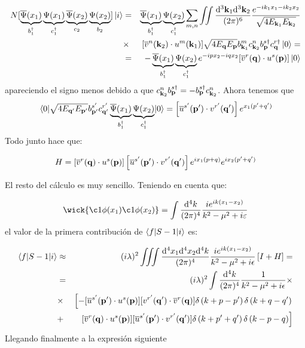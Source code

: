 \begin{solucion}
\begin{itemize}
		\begin{eqnarray*}			
			N[\underbrace{ \overline{\Psi} (x_1)}_{b^\dagger_1}\underbrace{ \Psi (x_1)}_{c^\dagger_1}  \underbrace{ \overline{\Psi} 	(x_2)}_{c_2} \underbrace{ \Psi (x_2)}_{b_2}] \ket{i} & = &\underbrace{ \overline{\Psi} (x_1)}_{b^\dagger_1}\underbrace{ \Psi (x_2)}_{c^\dagger_1}  \sum_{m,n} \iint \frac{\mathrm{d}^3 \mathbf{k}_1 \mathrm{d}^3 \mathbf{k}_2}{(2\pi)^6} \frac{e^{-i k_1 x_1 - i k_2 x_2}}{\sqrt{4E_{\mathbf{k}_1}E_{\mathbf{k}_2}}}  \\ & \times & [\overline{v}^n(\mathbf{k}_2) \cdot u^m(\mathbf{k}_1)] \sqrt{4E_{\mathbf{q}} E_{\mathbf{p}}} b_{\mathbf{k}_1}^m c_{\mathbf{k}_2}^n b_{\mathbf{p}}^{s\dagger} c_ {\mathbf{q}}^{r \dagger}  \ket{0} =  \\
			& = & -\underbrace{ \overline{\Psi} (x_1)}_{b^\dagger_1}\underbrace{ \Psi (x_2)}_{c^\dagger_1}  e^{-i p x_2 - i q x_2} [\overline{v}^r(\mathbf{q}) \cdot u^s(\mathbf{p})]  \ket{0}  
		\end{eqnarray*}
		apareciendo el signo menos debido a que $c_{\mathbf{k}_2}^n b_{\mathbf{p}}^{s\dagger}=- b_{\mathbf{p}}^{s\dagger}c_{\mathbf{k}_2}^n$. Ahora tenemos que 
		\begin{eqnarray*}
			\mel{0}{ \sqrt{4E_{\mathbf{q}'} E_{\mathbf{p}'}} b_{\mathbf{p}'}^{s'} c_{\mathbf{q}'}^{r'} \underbrace{ \overline{\Psi}(x_1)}_{b^\dagger_1}\underbrace{ \Psi (x_2)}_{c^\dagger_1} }{0} =
			 \left[ \overline{u}^{s'}(\mathbf{p}') \cdot v^{r'}(\mathbf{q}') \right] e^{x_1 (p'+q')}
		\end{eqnarray*}
		Todo junto hace que:
		
		\begin{equation*}
			H = \left[ \overline{v}^{r}(\mathbf{q}) \cdot u^{s}(\mathbf{p}) \right] \left[ \overline{u}^{s'}(\mathbf{p}') \cdot v^{r'}(\mathbf{q}') \right]e^{ix_1(p+q)}e^{ix_2(p'+q')}
		\end{equation*}
	\end{itemize}
	El resto del cálculo es muy sencillo. Teniendo en cuenta que:
	
	\begin{equation*}
		\wick{\c1{\phi}(x_1)\c1{\phi} (x_2)} = \int \frac{\D^4 k}{(2\pi)^4} \frac{ie^{ik(x_1-x_2)}}{k^2 - \mu^2 + i \varepsilon}
	\end{equation*}
	el valor de la primera contribución de $\mel**{f}{S-1}{i} $ es:
	
	\begin{eqnarray*}
		\mel**{f}{S-1}{i}  & \approx & (i\lambda)^2\iiint \frac{\mathrm{d}^4 x_1 \mathrm{d}^4 x_2 \mathrm{d}^4  k}{(2\pi)^4} \frac{ie^{ik(x_1-x_2)}}{k^2 - \mu^2 + i \epsilon}  \left[ I+H \right] = \\
		& = & (i\lambda)^2\int \frac{\mathrm{d}^4  k}{(2\pi)^4} \frac{1}{k^2 - \mu^2 + i \epsilon} \times \\
		& \times &  \left[ - [\overline{u}^{s'}(\mathbf{p}') \cdot u^{s}(\mathbf{p})]  [v^{r'}(\mathbf{q}') \cdot \overline{v}^{r}(\mathbf{q})] \delta \left( k+p-p' \right)\delta \left( k+q-q' \right) \right. \\
		& + & \left.  [\overline{v}^{r}(\mathbf{q}) \cdot u^{s}(\mathbf{p})] [\overline{u}^{s'}(\mathbf{p}') \cdot v^{r'}(\mathbf{q}')] \delta \left( k+p'+q' \right)\delta \left( k-p-q \right) \right]
	\end{eqnarray*}	
	Llegando finalmente a la expresión siguiente
	

\end{solucion}
